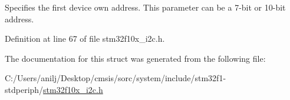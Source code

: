 Specifies the first device own address. This parameter can be a 7-\/bit or 10-\/bit address. 

Definition at line 67 of file stm32f10x\+\_\+i2c.\+h.



The documentation for this struct was generated from the following file\+:\begin{DoxyCompactItemize}
\item 
C\+:/\+Users/anilj/\+Desktop/cmsis/sorc/system/include/stm32f1-\/stdperiph/\hyperlink{stm32f10x__i2c_8h}{stm32f10x\+\_\+i2c.\+h}\end{DoxyCompactItemize}
